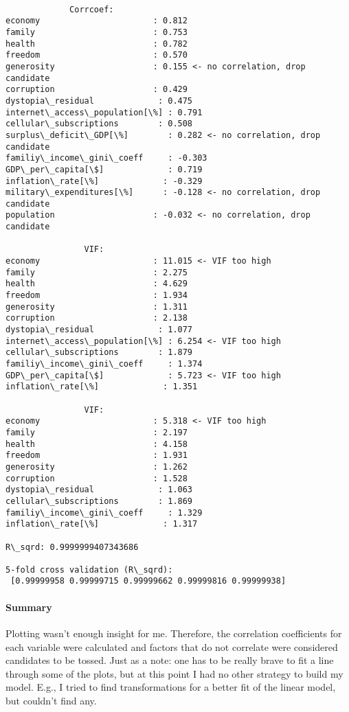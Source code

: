 \documentclass[11pt]{article}
\begin{document}
    \begin{Verbatim}[commandchars=\\\{\}]

             Corrcoef:
economy                       : 0.812 
family                        : 0.753 
health                        : 0.782 
freedom                       : 0.570 
generosity                    : 0.155 <- no correlation, drop candidate
corruption                    : 0.429 
dystopia\_residual             : 0.475 
internet\_access\_population[\%] : 0.791 
cellular\_subscriptions        : 0.508 
surplus\_deficit\_GDP[\%]        : 0.282 <- no correlation, drop candidate
familiy\_income\_gini\_coeff     : -0.303 
GDP\_per\_capita[\$]             : 0.719 
inflation\_rate[\%]             : -0.329 
military\_expenditures[\%]      : -0.128 <- no correlation, drop candidate
population                    : -0.032 <- no correlation, drop candidate

                VIF:
economy                       : 11.015 <- VIF too high
family                        : 2.275 
health                        : 4.629 
freedom                       : 1.934 
generosity                    : 1.311 
corruption                    : 2.138 
dystopia\_residual             : 1.077 
internet\_access\_population[\%] : 6.254 <- VIF too high
cellular\_subscriptions        : 1.879 
familiy\_income\_gini\_coeff     : 1.374 
GDP\_per\_capita[\$]             : 5.723 <- VIF too high
inflation\_rate[\%]             : 1.351 

                VIF:
economy                       : 5.318 <- VIF too high
family                        : 2.197 
health                        : 4.158 
freedom                       : 1.931 
generosity                    : 1.262 
corruption                    : 1.528 
dystopia\_residual             : 1.063 
cellular\_subscriptions        : 1.869 
familiy\_income\_gini\_coeff     : 1.329 
inflation\_rate[\%]             : 1.317 

R\_sqrd: 0.9999999407343686

5-fold cross validation (R\_sqrd):
 [0.99999958 0.99999715 0.99999662 0.99999816 0.99999938]

    \end{Verbatim}

    \paragraph{Summary}

Plotting wasn't enough insight for me. Therefore, the correlation
coefficients for each variable were calculated and factors that do not
correlate were considered candidates to be tossed. Just as a note: one
has to be really brave to fit a line through some of the plots, but at
this point I had no other strategy to build my model. E.g., I tried to
find transformations for a better fit of the linear model, but couldn't
find any.\newline
\end{document}
